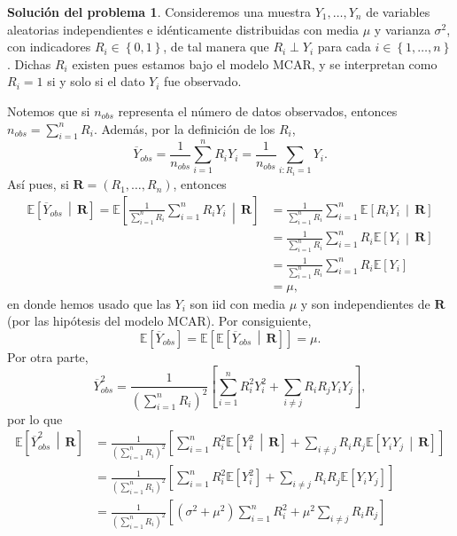 \documentclass[twoside,12pt]{article}
\theoremstyle{definition}
\newtheorem{soln}{Solución del problema}
\newcommand{\expectation}[1]{\mathbb{E}\left[#1\right]}
\newcommand{\given}{\,\middle|\,}
\begin{document}
\newpage
\begin{soln}
Consideremos una muestra $Y_1, \ldots, Y_n$ de variables aleatorias independientes e idénticamente distribuidas con media $\mu$ y varianza $\sigma^2$, con indicadores $R_i \in \left\lbrace 0, 1 \right\rbrace$, de tal manera que $R_i\perp Y_i$ para cada $i\in \left\lbrace 1, \ldots, n \right\rbrace$. Dichas $R_i$ existen pues estamos bajo el modelo MCAR, y se interpretan como $R_i = 1$ si y solo si el dato $Y_i$ fue observado.

Notemos que si $n_{obs}$ representa el número de datos observados, entonces $n_{obs} = \sum_{i=1}^{n} R_i$. Además, por la definición de los $R_i$,
\[
\overline{Y}_{obs} = \frac{1}{n_{obs}} \sum_{i=1}^{n} R_i Y_i = \frac{1}{n_{obs}} \sum_{i: R_i=1} Y_i.
\]
Así pues, si $\boldsymbol{R}=(R_1, \ldots, R_n)$, entonces
\[
\begin{split}
  \expectation{\overline{Y}_{obs} \given \boldsymbol{R}} = \expectation{\frac{1}{\sum_{i=1}^{n} R_i} \sum_{i=1}^{n} R_i Y_i  \given \boldsymbol{R}} &= \frac{1}{\sum_{i=1}^{n} R_i} \sum_{i=1}^{n} \expectation{R_i Y_i \given \boldsymbol{R}}\\
  &= \frac{1}{\sum_{i=1}^{n} R_i} \sum_{i=1}^{n} R_i\expectation{Y_i \given \boldsymbol{R}}\\
  &= \frac{1}{\sum_{i=1}^{n} R_i} \sum_{i=1}^{n} R_i\expectation{Y_i}\\
  &=\mu,
\end{split}
\]
en donde hemos usado que las $Y_i$ son iid con media $\mu$ y son independientes de $\boldsymbol{R}$ (por las hipótesis del modelo MCAR). Por consiguiente,
\[
\expectation{\overline{Y}_{obs}} = \expectation{\expectation{\overline{Y}_{obs} \given \boldsymbol{R}}} = \mu.
\]
Por otra parte,
\[
\overline{Y}_{obs}^2 = \frac{1}{{\left(\sum_{i=1}^{n} R_i\right)}^2} \left[\sum_{i=1}^{n}R_i^2 Y_i^2 + \sum_{i\neq j}R_i R_j Y_i Y_j\right],
\]
por lo que
\[
\begin{split}
  \expectation{\overline{Y}_{obs}^2 \given \boldsymbol{R}} &= \frac{1}{{\left(\sum_{i=1}^{n} R_i\right)}^2} \left[\sum_{i=1}^{n} R_i^2 \expectation{Y_i^2 \given \boldsymbol{R}} + \sum_{i\neq j}R_i R_j \expectation{Y_i Y_j \given \boldsymbol{R}}\right]\\
  &= \frac{1}{{\left(\sum_{i=1}^{n} R_i\right)}^2} \left[\sum_{i=1}^{n} R_i^2 \expectation{Y_i^2} + \sum_{i\neq j}R_i R_j \expectation{Y_i Y_j}\right]\\
  &= \frac{1}{{\left(\sum_{i=1}^{n} R_i\right)}^2} \left[(\sigma^2+\mu^2)\sum_{i=1}^{n} R_i^2 + \mu^2\sum_{i\neq j}R_i R_j\right]\\

\end{split}\]
\end{soln}
\end{document}
